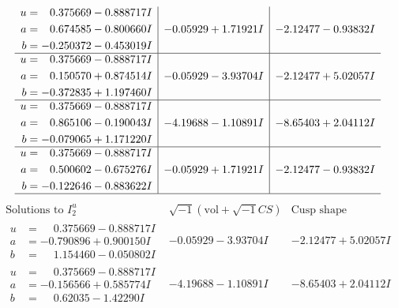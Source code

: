 \documentclass[1p]{elsarticle_modified}
\theoremstyle{definition}
\newcommand{\I}{\sqrt{-1}}
\begin{document}
$$\begin{array}{c|c|c}
\begin{aligned}
u &= \phantom{-}0.375669 - 0.888717 I \\
a &= \phantom{-}0.674585 - 0.800660 I \\
b &= -0.250372 - 0.453019 I\end{aligned}
 & -0.05929 + 1.71921 I & -2.12477 - 0.93832 I \\ \hline\begin{aligned}
u &= \phantom{-}0.375669 - 0.888717 I \\
a &= \phantom{-}0.150570 + 0.874514 I \\
b &= -0.372835 + 1.197460 I\end{aligned}
 & -0.05929 - 3.93704 I & -2.12477 + 5.02057 I \\ \hline\begin{aligned}
u &= \phantom{-}0.375669 - 0.888717 I \\
a &= \phantom{-}0.865106 - 0.190043 I \\
b &= -0.079065 + 1.171220 I\end{aligned}
 & -4.19688 - 1.10891 I & -8.65403 + 2.04112 I \\ \hline\begin{aligned}
u &= \phantom{-}0.375669 - 0.888717 I \\
a &= \phantom{-}0.500602 - 0.675276 I \\
b &= -0.122646 - 0.883622 I\end{aligned}
 & -0.05929 + 1.71921 I & -2.12477 - 0.93832 I\\
 \hline 
 \end{array}$$\newpage$$\begin{array}{c|c|c}  
\text{Solutions to }I^u_{2}& \I (\text{vol} + \sqrt{-1}CS) & \text{Cusp shape}\\
 \hline 
\begin{aligned}
u &= \phantom{-}0.375669 - 0.888717 I \\
a &= -0.790896 + 0.900150 I \\
b &= \phantom{-}1.154460 - 0.050802 I\end{aligned}
 & -0.05929 - 3.93704 I & -2.12477 + 5.02057 I \\ \hline\begin{aligned}
u &= \phantom{-}0.375669 - 0.888717 I \\
a &= -0.156566 + 0.585774 I \\
b &= \phantom{-}0.62035 - 1.42290 I\end{aligned}
 & -4.19688 - 1.10891 I & -8.65403 + 2.04112 I \\ \hline\begin{aligned}

\end{aligned}
\end{array}$$
\end{document}
